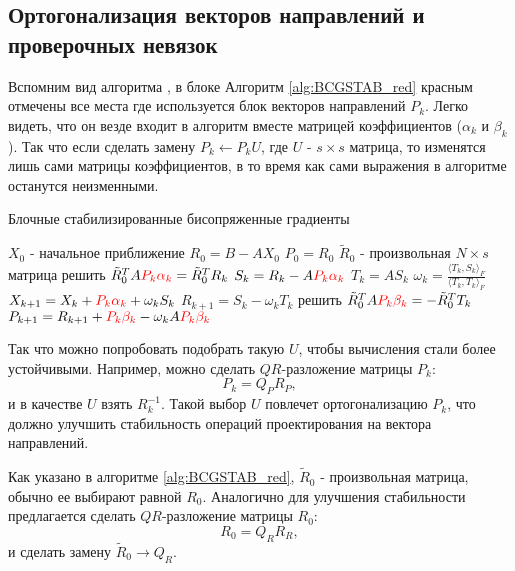 \subsection{Ортогонализация векторов направлений и проверочных невязок}

Вспомним вид алгоритма \cite{elGuennouni2003}, в блоке Алгоритм \ref{alg:BCGSTAB_red} красным отмечены
все места где используется блок векторов направлений $P_k$. Легко видеть, что он везде
входит в алгоритм вместе матрицей коэффициентов ($\alpha_k$ и $\beta_k$). Так что если сделать замену
$P_k \gets P_k U$, где $U$ - $s \times s$ матрица, то изменятся лишь сами матрицы коэффициентов,
в то время как сами выражения в алгоритме останутся неизменными.       
\begin{algorithm}
    \caption{Блочные стабилизированные бисопряженные градиенты}\label{alg:BCGSTAB_red}
    \begin{algorithmic}
    \State $X_0$ - начальное приближение
    \State $R_0 = B - AX_0$
    \State $P_0 = R_0$
    \State $\tilde{R}_0$ - произвольная $N \times s$ матрица
        \State решить $\tilde{R}_0^TA {\color{red}P_k\alpha_k} = \tilde{R}_0^TR_k$
        \State $S_k=R_k-A{\color{red}P_k\alpha_k}$
        \State $T_k=AS_k$
        \State $\omega_k = \frac{\langle T_k,S_k\rangle_F}{\langle T_k, T_k\rangle_F}$
        \State $X_{k+1}=X_k + {\color{red}P_k\alpha_k} + \omega_kS_k$
        \State $R_{k+1} = S_k - \omega_k T_k$
        \State решить $\tilde{R}_0^TA{\color{red}P_k\beta_k} = -\tilde{R}_0^TT_k$
        \State $P_{k+1}=R_{k+1} + {\color{red}P_k\beta_k} - \omega_k A{\color{red}P_k\beta_k}$
    \EndFor  
    \end{algorithmic}
\end{algorithm}
Так что можно попробовать подобрать такую $U$, чтобы вычисления стали более устойчивыми. Например, можно 
сделать $QR$-разложение матрицы $P_k$:
$$P_k = Q_PR_P,$$
и в качестве $U$ взять $R_k^{-1}$. Такой выбор $U$ повлечет ортогонализацию $P_k$, что должно улучшить стабильность
операций проектирования на вектора направлений.
\par Как указано в алгоритме \ref{alg:BCGSTAB_red}, $\tilde{R}_0$ - произвольная матрица, обычно ее выбирают равной
$R_0$. Аналогично для улучшения стабильности предлагается сделать $QR$-разложение матрицы
$R_0$:
$$R_0 = Q_R R_R,$$
и сделать замену $\tilde{R}_0 \rightarrow Q_R$.

